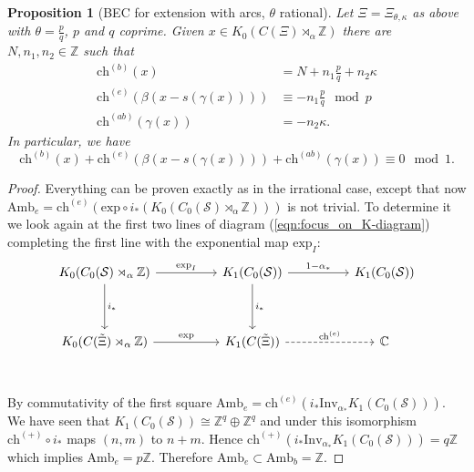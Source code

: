\documentclass[11pt]{amsart}
\newtheorem{prop}{Proposition}[section]
\newcommand{\Z}{\mathbb{Z}}
\newcommand{\C}{\mathbb{C}}
\newcommand{\cut}{\kappa}
\newcommand{\ch}{\text{ch}}
\newcommand{\chb}{\text{ch}^{(b)}}
\newcommand{\che}{\text{ch}^{(e)}}
\newcommand{\chab}{\text{ch}^{(ab)}}
\newcommand{\p}{p}
\newcommand{\q}{q}
\begin{document}
\begin{prop}[BEC for extension with arcs, $\theta$ rational]
	\label{propositionBBC_TwoCuts_rational}
Let $\Xi=\Xi_{\theta,\cut}$ as above with $\theta=\frac{\p}{\q}$, $\p$ and $\q$ coprime. 
Given $x\in K_0(C(\Xi) \rtimes_\alpha \mathbb{Z})$ there are $N,n_1,n_2\in \Z$ such that
	\begin{align*}
		\chb(x)&=N+n_1\frac{\p}{\q}+n_2\cut\\
		\che(\beta(x-s(\gamma(x))))&\equiv -n_1\frac{\p}{\q} \mod{p}\\
		\chab(\gamma(x))&=-  n_2\cut.
	\end{align*}
	In particular, we have
	$$\chb(x)+\che(\beta(x-s(\gamma(x))))+ \chab(\gamma(x))  \equiv 0 \mod{1}.$$
\end{prop}
\begin{proof}
Everything can be proven exactly as in the irrational case, except that now $\mathrm{Amb}_e =\che(\mathrm{exp}\circ i_*(K_0(C_0(\mathcal{S}) \rtimes_\alpha \mathbb{Z})))$ is not trivial. To determine it we look again at the first two lines of diagram (\ref{eqn:focus_on_K-diagram}) completing the first line with the exponential map $\mathrm{exp}_I$:
	\begin{equation*}
		\begin{tikzcd}
			{K_0(C_0(\mathcal{S}) \rtimes_\alpha \mathbb{Z})} && K_1(C_0(\mathcal{S}))&& K_1(C_0(\mathcal{S})) \\
			\\
			{K_0(C(\tilde{\Xi})\rtimes_\alpha \mathbb{Z})} && {K_1(C(\tilde{\Xi}))} && \C  \\
			\arrow["{i_*}", from=1-1, to=3-1]
			\arrow["{i_*}", from=1-3, to=3-3]
			\arrow["{\exp}", from=3-1, to=3-3]
			\arrow["{\mathrm{exp}_I}", from=1-1, to=1-3]
			\arrow[dashed, "{\che}", from=3-3, to=3-5]
			\arrow["{1-\alpha_*}", from=1-3, to=1-5]
		\end{tikzcd}
	\end{equation*}	
By commutativity of the first square $\mathrm{Amb}_e = \che(i_* \mathrm{Inv}_{\alpha_*} K_1(C_0(\mathcal S)))$. We have seen that $K_1(C_0(\mathcal S))\cong \Z^q\oplus \Z^q$ and under this isomorphism $\ch^{(+)}\circ i_*$ maps $(n,m)$ to $n+m$. Hence $\ch^{(+)}(i_* \mathrm{Inv}_{\alpha_*} K_1(C_0(\mathcal S)))=q\Z$ which implies $\mathrm{Amb}_e = p\Z$. Therefore $\mathrm{Amb}_e \subset \mathrm{Amb}_b=\Z$.
\end{proof}
\end{document}
